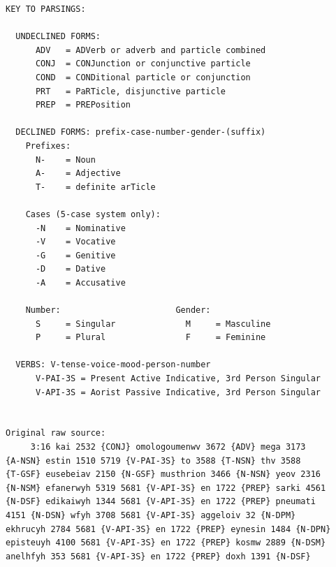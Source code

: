\documentclass[letterpaper]{article}
\begin{document}
\begin{verbatim}
KEY TO PARSINGS:

  UNDECLINED FORMS:
      ADV   = ADVerb or adverb and particle combined
      CONJ  = CONJunction or conjunctive particle
      COND  = CONDitional particle or conjunction
      PRT   = PaRTicle, disjunctive particle
      PREP  = PREPosition

  DECLINED FORMS: prefix-case-number-gender-(suffix)
    Prefixes:
      N-    = Noun
      A-    = Adjective
      T-    = definite arTicle

    Cases (5-case system only):
      -N    = Nominative
      -V    = Vocative
      -G    = Genitive
      -D    = Dative
      -A    = Accusative

    Number:                       Gender:
      S     = Singular              M     = Masculine
      P     = Plural                F     = Feminine

  VERBS: V-tense-voice-mood-person-number
      V-PAI-3S = Present Active Indicative, 3rd Person Singular
      V-API-3S = Aorist Passive Indicative, 3rd Person Singular


Original raw source:
     3:16 kai 2532 {CONJ} omologoumenwv 3672 {ADV} mega 3173
{A-NSN} estin 1510 5719 {V-PAI-3S} to 3588 {T-NSN} thv 3588
{T-GSF} eusebeiav 2150 {N-GSF} musthrion 3466 {N-NSN} yeov 2316
{N-NSM} efanerwyh 5319 5681 {V-API-3S} en 1722 {PREP} sarki 4561
{N-DSF} edikaiwyh 1344 5681 {V-API-3S} en 1722 {PREP} pneumati
4151 {N-DSN} wfyh 3708 5681 {V-API-3S} aggeloiv 32 {N-DPM}
ekhrucyh 2784 5681 {V-API-3S} en 1722 {PREP} eynesin 1484 {N-DPN}
episteuyh 4100 5681 {V-API-3S} en 1722 {PREP} kosmw 2889 {N-DSM}
anelhfyh 353 5681 {V-API-3S} en 1722 {PREP} doxh 1391 {N-DSF}
\end{verbatim}
\end{document}
